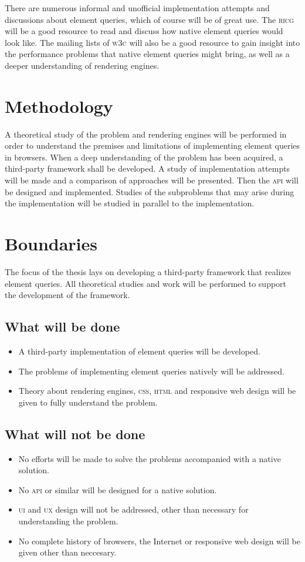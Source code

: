 \documentclass[oneside,a4paper,11pt]{kth-mag}
\begin{document}
There are numerous informal and unofficial implementation attempts and discussions about element queries, which of course will be of great use.
The \textsc{ricg} will be a good resource to read and discuss how native element queries would look like.
The mailing lists of \textsc{w3c} will also be a good resource to gain insight into the performance problems that native element queries might bring, as well as a deeper understanding of rendering engines.

\section{Methodology}
A theoretical study of the problem and rendering engines will be performed in order to understand the premises and limitations of implementing element queries in browsers.
When a deep understanding of the problem has been acquired, a third-party framework shall be developed.
A study of implementation attempts will be made and a comparison of approaches will be presented.
Then the \textsc{api} will be designed and implemented.
Studies of the subproblems that may arise during the implementation will be studied in parallel to the implementation.

\section{Boundaries}
The focus of the thesis lays on developing a third-party framework that realizes element queries.
All theoretical studies and work will be performed to support the development of the framework.

\subsection{What will be done}
\begin{itemize}
\item A third-party implementation of element queries will be developed.
\item The problems of implementing element queries natively will be addressed.
\item Theory about rendering engines, \textsc{css}, \textsc{html} and responsive web design will be given to fully understand the problem.
\end{itemize}

\subsection{What will not be done}
\begin{itemize}
\item No efforts will be made to solve the problems accompanied with a native solution.
\item No \textsc{api} or similar will be designed for a native solution.
\item \textsc{ui} and \textsc{ux} design will not be addressed, other than necessary for understanding the problem.
\item No complete history of browsers, the Internet or responsive web design will be given other than neccesary.
\end{itemize}
\end{document}
